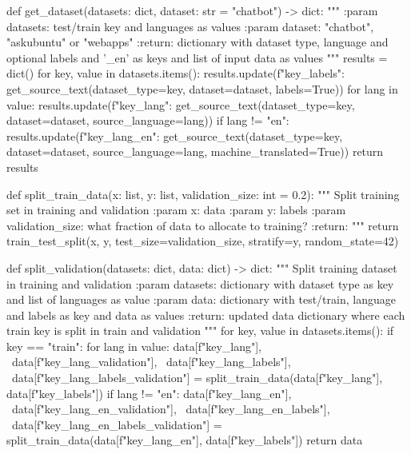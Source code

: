 \begin{python}
def get_dataset(datasets: dict, dataset: str = "chatbot") -> dict:
    """
    :param datasets: test/train key and languages as values
    :param dataset: "chatbot", "askubuntu" or "webapps"
    :return: dictionary with dataset type, language and optional labels and '_en' as keys and list of input data as values
    """
    results = dict()
    for key, value in datasets.items():
        results.update({f"{key}_labels": get_source_text(dataset_type=key, dataset=dataset, labels=True)})
        for lang in value:
            results.update({f"{key}_{lang}": get_source_text(dataset_type=key, dataset=dataset, source_language=lang)})
            if lang != "en":
                results.update({f"{key}_{lang}_en": get_source_text(dataset_type=key, dataset=dataset,
                                                                    source_language=lang, machine_translated=True)})
    return results


def split_train_data(x: list, y: list, validation_size: int = 0.2):
    """ Split training set in training and validation
    :param x: data
    :param y: labels
    :param validation_size: what fraction of data to allocate to training?
    :return:
    """
    return train_test_split(x, y, test_size=validation_size, stratify=y, random_state=42)


def split_validation(datasets: dict, data: dict) -> dict:
    """ Split training dataset in training and validation
    :param datasets: dictionary with dataset type as key and list of languages as value
    :param data: dictionary with test/train, language and labels as key and data as values
    :return: updated data dictionary where each train key is split in train and validation
    """
    for key, value in datasets.items():
        if key == "train":
            for lang in value:
                data[f"{key}_{lang}"], \
                    data[f"{key}_{lang}_validation"], \
                    data[f"{key}_{lang}_labels"], \
                    data[f"{key}_{lang}_labels_validation"] = split_train_data(data[f"{key}_{lang}"],
                                                                               data[f"{key}_labels"])
                if lang != "en":
                    data[f"{key}_{lang}_en"], \
                        data[f"{key}_{lang}_en_validation"], \
                        data[f"{key}_{lang}_en_labels"], \
                        data[f"{key}_{lang}_en_labels_validation"] = split_train_data(data[f"{key}_{lang}_en"],
                                                                                      data[f"{key}_labels"])
    return data



\end{python}
